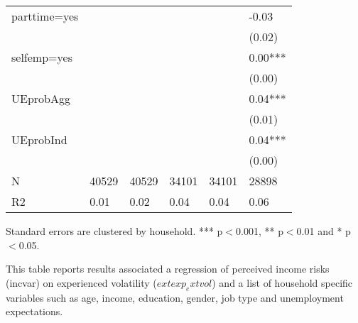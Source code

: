 \begin{table}[p]
\begin{adjustbox}{width=\textwidth}
\begin{threeparttable}
\begin{tabular}{llllll}
parttime=yes     &          &           &            &             &        -0.03 \\
                 &          &           &            &             &       (0.02) \\
selfemp=yes      &          &           &            &             &      0.00*** \\
                 &          &           &            &             &       (0.00) \\
UEprobAgg        &          &           &            &             &      0.04*** \\
                 &          &           &            &             &       (0.01) \\
UEprobInd        &          &           &            &             &      0.04*** \\
                 &          &           &            &             &       (0.00) \\
N                &    40529 &     40529 &      34101 &       34101 &        28898 \\
R2               &     0.01 &      0.02 &       0.04 &        0.04 &         0.06 \\
\bottomrule
\end{tabular}
\begin{tablenotes}\item Standard errors are clustered by household. *** p$<$0.001, ** p$<$0.01 and * p$<$0.05. 
\item This table reports results associated a regression of perceived income risks (incvar) on experienced volatility ($	ext{exp}_	ext{vol}$) and a list of household specific variables such as age, income, education, gender, job type and unemployment expectations.
\end{tablenotes}
\end{threeparttable}
\end{adjustbox}
\end{table}
